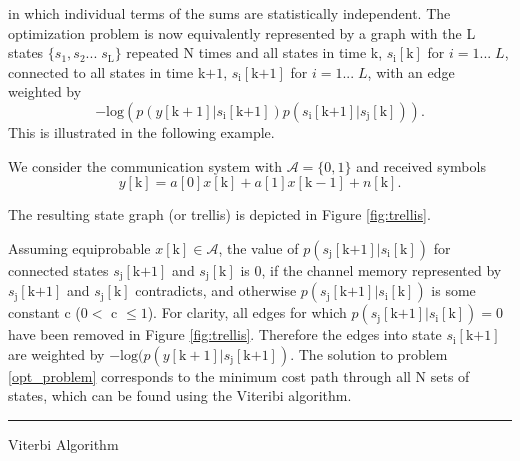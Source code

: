 in which individual terms of the sums are statistically independent. The optimization problem is now equivalently
  represented by a graph with the L states $\{s_1, s_2... \;s_{\text{L}}\}$ repeated N times and all states in time k, $s_{\text{i}}[\text{k}]$ for $ i = 1... \;L$, connected to all states in time k$+1$, $s_{\text{i}}[\text{k+1}]$ for $ i = 1... \;L$,
   with an edge weighted by
\begin{equation*}
-\text{log}(p(y[\text{k}+1]|s_{\text{i}}[\text{k+1}])p(s_{\text{i}}[\text{k+1}]|s_{\text{j}}[\text{k}])).
\end{equation*}   
This is illustrated in the following example. 
   \par
   We consider the communication system with $\mathcal{A}=\{0, 1\}$ and received symbols 
   \begin{equation*}
y[\text{k}] =  a[\text{0}]x[\text{k}] + a[\text{1}]x[\text{k}-1] + n[\text{k}].
\end{equation*}

The resulting state graph (or trellis) is depicted in Figure \ref{fig:trellis}. 

Assuming equiprobable 
$x[\text{k}] \in \mathcal{A}$, the value of $p(s_{\text{j}}[\text{k+1}]|s_{\text{i}}[\text{k}])$ for connected states $s_{\text{j}}[\text{k+1}]$ and $s_{\text{j}}[\text{k}]$ is  0, if the channel memory represented by $s_{\text{j}}[\text{k+1}]$ and $s_{\text{j}}[\text{k}]$ contradicts, and otherwise $p(s_{\text{j}}[\text{k+1}]|s_{\text{i}}[\text{k}])$  is some constant c ($0<$ c $\leq1$). For clarity, all edges for which $p(s_{\text{j}}[\text{k+1}]|s_{\text{i}}[\text{k}])=0$ have been removed in Figure \ref{fig:trellis}. Therefore the edges into state $s_{\text{i}}[\text{k+1}]$ are weighted by
$-\text{log}(p(y[\text{k}+1]|s_{\text{j}}[\text{k+1}])$. The solution to problem \ref{opt_problem} corresponds to the minimum cost path through all N sets of states, which can be found using the Viteribi algorithm. 
\\

    \noindent\rule[16pt]{\textwidth}{0.6pt}
	Viterbi Algorithm

